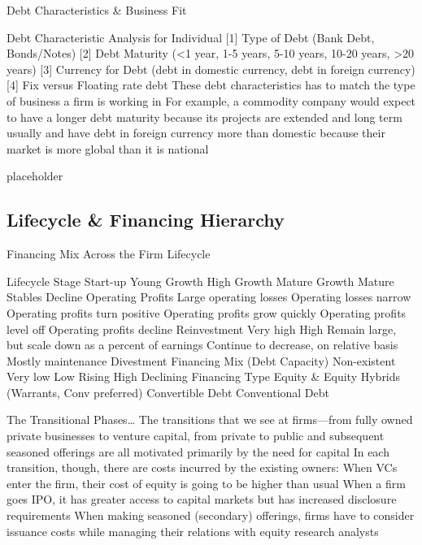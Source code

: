 \documentclass[10pt]{article}
\begin{document}
    \begin{core}{Debt Characteristics \& Business Fit}

      Debt Characteristic Analysis for Individual
      [1] Type of Debt (Bank Debt, Bonds/Notes)
      [2] Debt Maturity (<1 year, 1-5 years, 5-10 years, 10-20 years, >20 years)
      [3] Currency for Debt (debt in domestic currency, debt in foreign currency)
      [4] Fix versus Floating rate debt
      These debt characteristics has to match the type of business a firm is working in
      For example, a commodity company would expect to have a longer debt maturity because its projects are extended and long term usually and have debt in foreign currency more than domestic because their market is more global than it is national

    \end{core}

    \begin{core}{placeholder}


    \end{core}

  \subsection{Lifecycle \& Financing Hierarchy}

    \begin{core}{Financing Mix Across the Firm Lifecycle}

      Lifecycle Stage
      Start-up
      Young Growth
      High Growth
      Mature Growth
      Mature Stables
      Decline
      Operating Profits
      Large operating losses
      Operating losses narrow
      Operating profits turn positive
      Operating profits grow quickly
      Operating profits level off
      Operating profits decline
      Reinvestment
      Very high
      High
      Remain large, but scale down as a percent of earnings
      Continue to decrease, on relative basis
      Mostly maintenance
      Divestment
      Financing Mix
      (Debt Capacity)
      Non-existent
      Very low
      Low
      Rising
      High
      Declining
      Financing Type
      Equity & Equity Hybrids (Warrants, Conv preferred)
      Convertible Debt
      Conventional Debt

      The Transitional Phases…
      The transitions that we see at firms—from fully owned private businesses to venture capital, from private to public and subsequent seasoned offerings are all motivated primarily by the need for capital
      In each transition, though, there are costs incurred by the existing owners:
      When VCs enter the firm, their cost of equity is going to be higher than usual
      When a firm goes IPO, it has greater access to capital markets but has increased disclosure requirements
      When making seasoned (secondary) offerings, firms have to consider issuance costs while managing their relations with equity research analysts

    \end{core}
\end{document}
